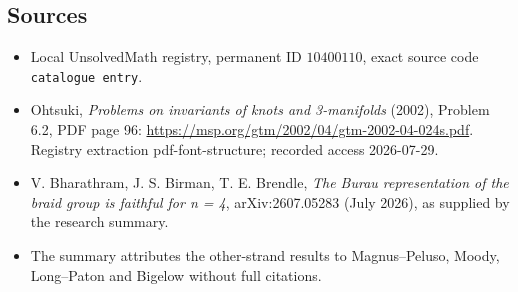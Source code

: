 \documentclass[11pt]{article}
\begin{document}
\subsection{Sources}
\begin{itemize}
\item Local UnsolvedMath registry, permanent ID \(10400110\), exact source code \texttt{catalogue entry}.
\item Ohtsuki, \emph{Problems on invariants of knots and 3-manifolds} (2002), Problem 6.2, PDF page 96: \url{https://msp.org/gtm/2002/04/gtm-2002-04-024s.pdf}. Registry extraction pdf-font-structure; recorded access 2026-07-29.
\item V. Bharathram, J. S. Birman, T. E. Brendle, \emph{The Burau representation of the braid group is faithful for n = 4}, arXiv:2607.05283 (July 2026), as supplied by the research summary.
\item The summary attributes the other-strand results to Magnus--Peluso, Moody, Long--Paton and Bigelow without full citations.
\end{itemize}
\end{document}
